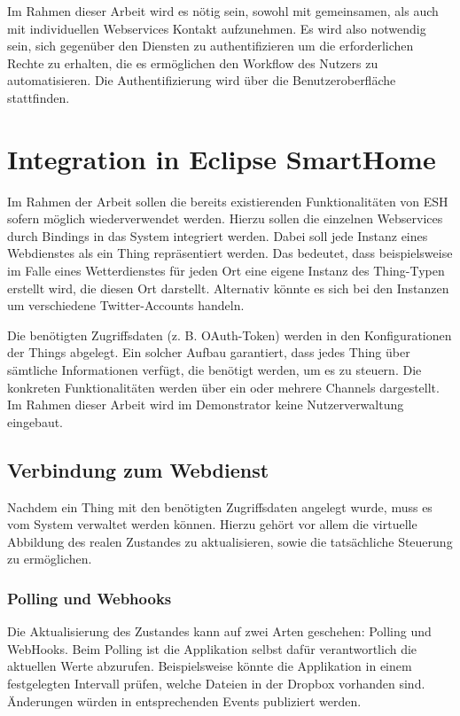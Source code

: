 Im Rahmen dieser Arbeit wird es nötig sein, sowohl mit gemeinsamen, als auch mit individuellen Webservices Kontakt aufzunehmen. Es wird also notwendig sein, sich gegenüber den Diensten zu authentifizieren um die erforderlichen Rechte zu erhalten, die es ermöglichen den Workflow des Nutzers zu automatisieren. Die Authentifizierung wird über die Benutzeroberfläche stattfinden.



\section{Integration in Eclipse SmartHome}
\label{sec:integrationESH}
Im Rahmen der Arbeit sollen die bereits existierenden Funktionalitäten von ESH sofern möglich wiederverwendet werden. Hierzu sollen die einzelnen Webservices durch Bindings in das System integriert werden. 
Dabei soll jede Instanz eines Webdienstes als ein Thing repräsentiert werden. Das bedeutet, dass beispielsweise im Falle eines Wetterdienstes für jeden Ort eine eigene Instanz des Thing-Typen erstellt wird, die diesen Ort darstellt. Alternativ könnte es sich bei den Instanzen um verschiedene Twitter-Accounts handeln.

Die benötigten Zugriffsdaten (z. B. OAuth-Token) werden in den Konfigurationen der Things abgelegt. Ein solcher Aufbau garantiert, dass jedes Thing über sämtliche Informationen verfügt, die benötigt werden, um es zu steuern. Die konkreten Funktionalitäten werden über ein oder mehrere Channels dargestellt. Im Rahmen dieser Arbeit wird im Demonstrator keine Nutzerverwaltung eingebaut.


\subsection{Verbindung zum Webdienst}
Nachdem ein Thing mit den benötigten Zugriffsdaten angelegt wurde, muss es vom System verwaltet werden können. Hierzu gehört vor allem die virtuelle Abbildung des realen Zustandes zu aktualisieren, sowie die tatsächliche Steuerung zu ermöglichen. 

\subsubsection{Polling und Webhooks}
Die Aktualisierung des Zustandes kann auf zwei Arten geschehen: Polling und WebHooks. Beim Polling ist die Applikation selbst dafür verantwortlich die aktuellen Werte abzurufen. Beispielsweise könnte die Applikation in einem festgelegten Intervall prüfen, welche Dateien in der Dropbox vorhanden sind. Änderungen würden in entsprechenden Events publiziert werden.\\

